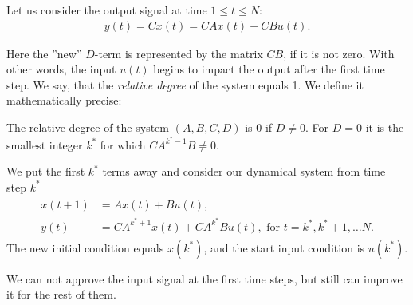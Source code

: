 Let us consider the output signal at time $1\leq t \leq N$:
\begin{align}
y(t) = C x(t) = CA x(t) + C B u(t).
\end{align}

Here the ''new'' $D$-term is represented by the matrix $CB$, if it is not zero. 
With other words, the input $u(t)$ begins to impact the output after the first time step. We say, that the  \textit{relative degree} of the system equals 1. We define it mathematically precise: 
\begin{defi}
	The relative degree of the system $(A, B, C, D)$ is 0 if $D \neq 0$. For $D = 0$ it is the smallest integer $k^*$ for which $	C A^{k^*-1} B \neq 0$.
\end{defi} 

We put the first $k^*$ terms away and consider our dynamical system from time step $k^*$
\begin{align}
\begin{split}
x(t+1) &= A x(t) + B u(t), \\
y(t) &= C A^{k^* + 1}x(t) + C A^{k^*} B u(t),  \text{ for } t = k^*, k^* + 1, \dots N. 
\end{split}
\end{align}
The new initial condition equals $x(k^*)$, and the start input condition is $u(k^*)$. 

We can not approve the input signal at the first time steps, but still can improve it for the rest of them. 

